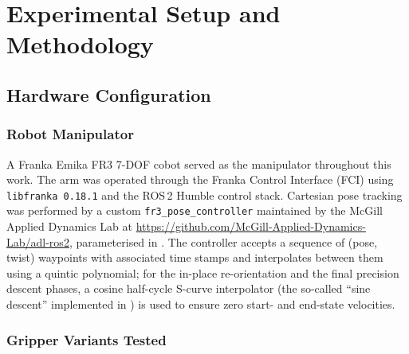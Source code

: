 \chapter{\rm\bfseries Experimental Setup and Methodology}
\label{ch:methods}

\section{Hardware Configuration}

\subsection{Robot Manipulator}

A Franka Emika FR3 7-DOF cobot served as the manipulator throughout this work.
The arm was operated through the Franka Control Interface (FCI) using
\texttt{libfranka 0.18.1} and the ROS\,2 Humble control stack. Cartesian
pose tracking was performed by a custom \texttt{fr3\_pose\_controller}
maintained by the McGill Applied Dynamics Lab at
\url{https://github.com/McGill-Applied-Dynamics-Lab/adl-ros2},
parameterised in . The controller accepts a
sequence of (pose, twist) waypoints with associated time stamps and
interpolates between them using a quintic polynomial; for the in-place
re-orientation and the final precision descent phases, a cosine half-cycle
S-curve interpolator (the so-called ``sine descent'' implemented in
) is used to ensure zero start- and end-state
velocities.

\subsection{Gripper Variants Tested}

